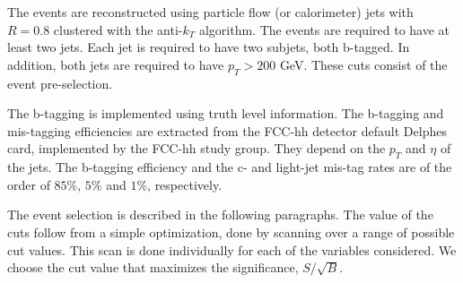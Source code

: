 The events are reconstructed using particle flow (or calorimeter) jets with $R=0.8$ clustered with the anti-$k_T$ algorithm. The events are required to have at least two jets. Each jet is required to have two subjets, both b-tagged. In addition, both jets are required to have $p_T>200$ GeV. These cuts consist of the event pre-selection.

The b-tagging is implemented using truth level information. The b-tagging and mis-tagging efficiencies are extracted from the FCC-hh detector default Delphes card, implemented by the FCC-hh study group. They depend on the $p_T$ and $\eta$ of the jets. The b-tagging efficiency and the c- and light-jet mis-tag rates are of the order of $85\%$, $5\%$ and $1\%$, respectively.

The event selection is described in the following paragraphs. The value of the cuts follow from a simple optimization, done by scanning over a range of possible cut values. This scan is done individually for each of the variables considered. We choose the cut value that maximizes the significance, $S/\sqrt{B}$. 

